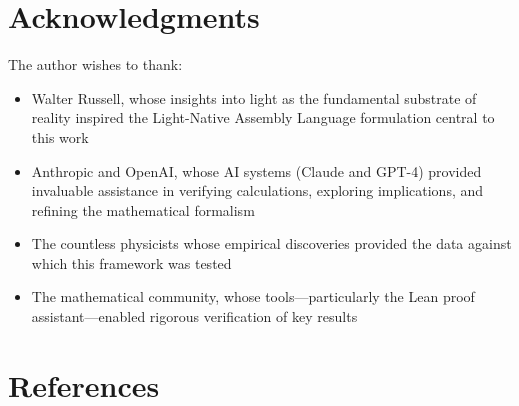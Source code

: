 \documentclass[12pt,a4paper]{article}
\theoremstyle{definition}
\begin{document}
\section*{Acknowledgments}

The author wishes to thank:

\begin{itemize}
    \item Walter Russell, whose insights into light as the fundamental substrate of reality inspired the Light-Native Assembly Language formulation central to this work
    \item Anthropic and OpenAI, whose AI systems (Claude and GPT-4) provided invaluable assistance in verifying calculations, exploring implications, and refining the mathematical formalism
    \item The countless physicists whose empirical discoveries provided the data against which this framework was tested
    \item The mathematical community, whose tools—particularly the Lean proof assistant—enabled rigorous verification of key results
\end{itemize}

\section*{References}
\end{document}
